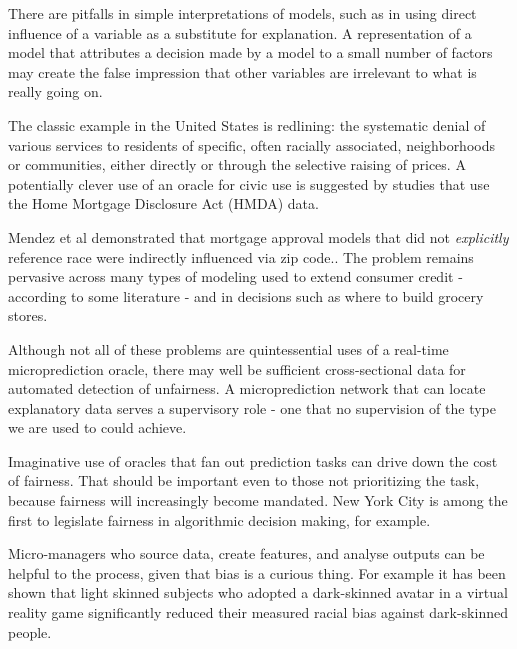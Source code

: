 There are pitfalls in simple interpretations of models, such as in using direct influence of a variable as a substitute for explanation. A representation of a model that attributes a decision made by a model to a small number of factors may create the false impression that other variables are irrelevant to what is really going on. 
 
  The classic example in the United States is redlining: the systematic denial of various services to residents of specific, often racially associated, neighborhoods or communities, either directly or through the selective raising of prices. A potentially clever use of an oracle for civic use is suggested by studies that use the Home Mortgage Disclosure Act (HMDA) data.
  
  Mendez et al demonstrated that mortgage approval models that did not {\em explicitly} reference race were indirectly influenced via  zip code.. The problem remains pervasive across many types of modeling used to extend consumer credit - according to some literature - and in decisions such as where to build grocery stores. 
  
Although not all of these problems are quintessential uses of a real-time microprediction oracle, there may well be sufficient cross-sectional data for automated detection of unfairness. A microprediction network that can locate explanatory data serves a supervisory role - one that no supervision of the type we are used to could achieve. 


Imaginative use of oracles that fan out prediction tasks can drive down the cost of fairness. That should be important even to those not prioritizing the task, because fairness will increasingly become mandated. New York City is among the first to legislate fairness in algorithmic decision making, for example. 

Micro-managers who source data, create features, and analyse outputs can be helpful to the process, given that bias is a curious thing. For example it has been shown that light skinned subjects who adopted a dark-skinned avatar in a virtual reality game significantly reduced their measured racial bias against dark-skinned people. 

